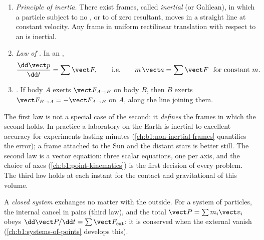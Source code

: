\begin{theorem}\label{thm:b1:newton-dynamics:laws}
\begin{enumerate}
  \item \emph{Principle of inertia.} There exist frames, called
        \emph{inertial} (or Galilean), in which a particle subject to
        no , or to  of zero resultant, moves in a straight
        line at constant velocity. Any frame in uniform rectilinear
        translation with respect to an  is inertial.
  \item \emph{Law of .} In an ,
        \[
        \frac{\dd\vect p}{\dd t} = \sum\vect F, \qquad \text{i.e.}\qquad
        m\,\vect a = \sum\vect F \ \text{ for constant } m .
        \]
  \item \emph{.} If body $A$ exerts $\vect F_{A\to B}$
        on body $B$, then $B$ exerts $\vect F_{B\to A} = -\vect F_{A\to B}$
        on $A$, along the line joining them.
\end{enumerate}
\end{theorem}
\admitted

\begin{remark}\label{rem:b1:newton-dynamics:meaning}
The first law is not a special case of the second: it \emph{defines}
the frames in which the second holds. In practice a laboratory on the
Earth is inertial to excellent accuracy for experiments lasting minutes
(\cref{ch:b1:non-inertial-frames} quantifies the error); a frame
attached to the Sun and the distant stars is better still. The second
law is a vector equation: three scalar equations, one per axis, and
the choice of axes (\cref{ch:b1:point-kinematics}) is the first
decision of every problem. The third law holds at each instant for
the contact and gravitational  of this volume.
\end{remark}

\begin{definition}\label{def:b1:newton-dynamics:conservation}
A \emph{closed system} exchanges no matter with the outside. For a
system of particles, the internal  cancel in pairs (third law),
and the total  $\vect P = \sum m_i\vect v_i$ obeys
$\dd\vect P/\dd t = \sum\vect F_{\mathrm{ext}}$: it is conserved when
the external  vanish (\cref{ch:b1:systems-of-points} develops
this).
\end{definition}

